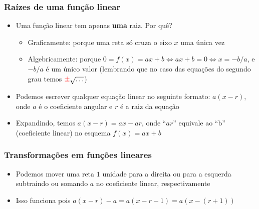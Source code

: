 \documentclass[usenames,dvipsnames,svgnames]{beamer}
\begin{document}
\begin{frame}
	\frametitle{Raízes de uma função linear}

	\begin{itemize}
		\item Uma função linear tem apenas \textbf{uma} raiz. Por quê?
		\begin{itemize}
			\item Graficamente: porque uma reta só cruza o eixo $x$ uma única vez
			\item Algebricamente: porque $0 = f(x) = ax + b \Leftrightarrow ax + b = 0 \Leftrightarrow x = -b/a$, e $-b/a$ é um único valor (lembrando que no caso das equações do segundo grau temos ${\color{red}\pm} \sqrt{\dots}$)
		\end{itemize}
		\item Podemos escrever qualquer equação linear no seguinte formato: $a(x-r)$, onde $a$ é o coeficiente angular e $r$ é a raiz da equação
		\item Expandindo, temos $a(x-r) = ax - ar$, onde ``$ar$'' equivale ao ``b'' (coeficiente linear) no esquema $f(x) = ax + b$
	\end{itemize}

\end{frame}

\begin{frame}
	\frametitle{Transformações em funções lineares}

	\begin{itemize}
		\item Podemos mover uma reta $1$ unidade para a direita ou para a esquerda subtraindo ou somando $a$ no coeficiente linear, respectivamente
		\item Isso funciona pois $a(x-r) - a = a(x-r-1) = a(x-(r+1))$
	\end{itemize}

	\begin{adjustbox}{max totalsize={\textwidth}{.6\textheight},center}
	\end{adjustbox}
\end{frame}
\end{document}
